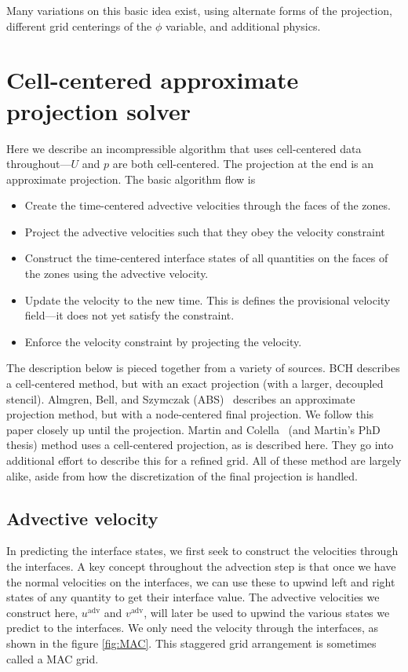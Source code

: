 Many variations on this basic idea exist, using alternate forms of the
projection, different grid centerings of the $\phi$ variable, and
additional physics.


\section{Cell-centered approximate projection solver}

Here we describe an incompressible algorithm that uses cell-centered
data throughout---$U$ and $p$ are both cell-centered.  The
projection at the end is an approximate projection.  The basic
algorithm flow is 
\begin{itemize}
\item Create the time-centered advective velocities through the faces
  of the zones.
\item Project the advective velocities such that they obey the
  velocity constraint
\item Construct the time-centered interface states of all quantities
  on the faces of the zones using the advective velocity.
\item Update the velocity to the new time.  This is defines the
  provisional velocity field---it does not yet satisfy the constraint.
\item Enforce the velocity constraint by projecting the velocity.
\end{itemize}

The description below is pieced together from a variety of sources.
BCH describes a cell-centered method, but with an exact projection
(with a larger, decoupled stencil).  Almgren, Bell, and Szymczak
(ABS)~\cite{ABS} describes an approximate projection method, but with
a node-centered final projection.  We follow this paper closely up
until the projection.  Martin and Colella~\cite{MartinColella} (and
Martin's PhD thesis) method uses a cell-centered projection, as is
described here.  They go into additional effort to describe this for a
refined grid.  All of these method are largely alike, aside from how
the discretization of the final projection is handled.

\subsection{Advective velocity}

In predicting the interface states, we first seek to construct the
velocities through the interfaces.  A key concept throughout the
advection step is that once we have the normal velocities on the
interfaces, we can use these to upwind left and right states of any
quantity to get their interface value.  The advective velocities we
construct here, ${u}^\mathrm{adv}$ and ${v}^\mathrm{adv}$,
will later be used to upwind the various states we predict to the
interfaces.  We only need the velocity through the interfaces, as
shown in the figure \ref{fig:MAC}. This staggered grid arrangement is
sometimes called a MAC grid.

